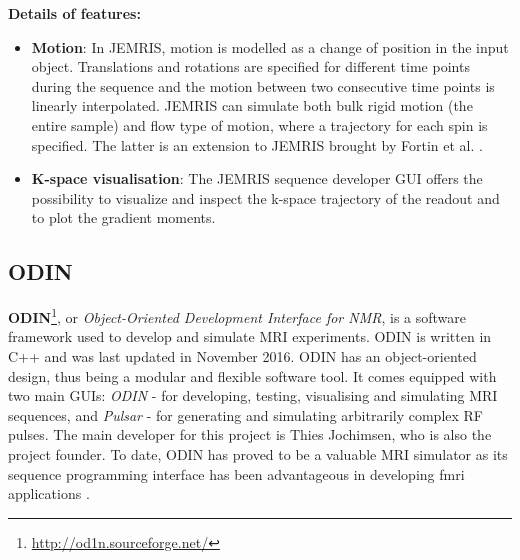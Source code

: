 \textbf{Details of features:}
\begin{itemize}
    
    \item \textbf{Motion}: In JEMRIS, motion is modelled as a change of position in the input object.
    Translations and rotations are specified for different time points during the sequence and the motion between two consecutive time points is linearly interpolated. 
    JEMRIS can simulate both bulk rigid motion (the entire sample) and flow type of motion, where a trajectory for each spin is specified. 
    The latter is an extension to JEMRIS brought by Fortin et al. \cite{Fortin2016}.
    
    \item \textbf{K-space visualisation}: The JEMRIS sequence developer GUI offers the possibility to visualize and inspect the k-space trajectory of the readout and to plot the gradient moments.

\end{itemize}

\hfill

\subsection{ODIN}
\textbf{ODIN}\footnote{\url{http://od1n.sourceforge.net/}}, or \textit{Object-Oriented Development Interface for NMR}, is a software framework used to develop and simulate MRI experiments.
ODIN is written in C++ and was last updated in November 2016.
ODIN has an object-oriented design, thus being a modular and flexible software tool.
It comes equipped with two main GUIs: \textit{ODIN} - for developing, testing, visualising and simulating MRI sequences, and \textit{Pulsar} - for generating and simulating arbitrarily complex RF pulses.
The main developer for this project is Thies Jochimsen, who is also the project founder.
To date, ODIN has proved to be a valuable MRI simulator as its sequence programming interface has been advantageous in developing \ac{fmri} applications \cite{Schafer2004}.

\hfill
    
